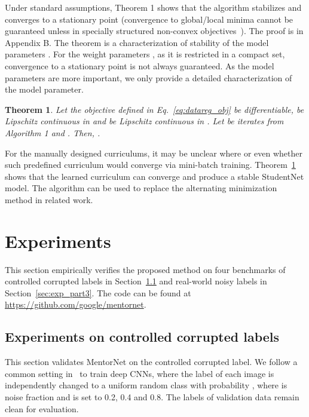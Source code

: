 \documentclass{article}
\newtheorem{theorem}{Theorem}
\begin{document}
Under standard assumptions, Theorem 1 shows that the algorithm stabilizes and converges to a stationary point (convergence to global/local minima cannot be guaranteed unless in specially structured non-convex objectives~\cite{chen2018gradient,zhou2017stochastic,zhou2017mirror}). The proof is in Appendix B. The theorem is a characterization of stability of the model parameters . For the weight parameters , as it is restricted in a compact set, convergence to a stationary point is not always guaranteed. As the model parameters are more important, we only provide a detailed characterization of the model parameter.

\begin{theorem}
\label{theorem:1}
Let the objective  defined in Eq.~\eqref{eq:datareg_obj} be differentiable,  be Lipschitz continuous in  and  be Lipschitz continuous in .
Let  be iterates from Algorithm 1 and  . Then,
.
\vspace{-2mm}
\end{theorem}

For the manually designed curriculums, it may be unclear where or even whether such predefined curriculum would converge via mini-batch training. Theorem~\ref{theorem:1} shows that the learned curriculum can converge and produce a stable StudentNet model. The algorithm can be used to replace the alternating minimization method in related work. 


\vspace{-3mm}
\section{Experiments}
This section empirically verifies the proposed method on four benchmarks of controlled corrupted labels in Section~\ref{sec:exp_part2} and real-world noisy labels in Section~\ref{sec:exp_part3}. The code can be found at {\small \url{https://github.com/google/mentornet}}.


\vspace{-2mm}
\subsection{Experiments on controlled corrupted labels}\label{sec:exp_part2}
\vspace{-2mm}
This section validates MentorNet on the controlled corrupted label. We follow a common setting in~\cite{zhang2017understanding} to train deep CNNs, where the label of each image is independently changed to a uniform random class with probability , where  is noise fraction and is set to 0.2, 0.4 and 0.8. The labels of validation data remain clean for evaluation.
\end{document}
